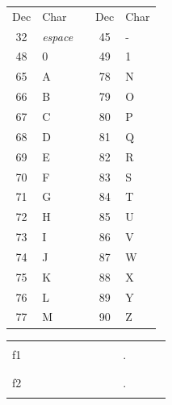 \documentclass[11pt,a4paper]{article}
\begin{document}
\begin{table}[ht!]
  \centering
  \begin{minipage}{0.3\textwidth}
    \centering

\begin{tabular}{ |c|C{0.9cm}| m{0.3cm} |c|C{0.9cm}| }
 
Dec & Char &   & Dec & Char \\
 
32 & { \scriptsize \textit{espace} }  &  & 45 & - \\
 
48 & 0 &  & 49 & 1 \\
 
65 & A &  & 78 & N \\
66 & B &  & 79 & O \\
67 & C &  & 80 & P \\
68 & D &  & 81 & Q \\
69 & E &  & 82 & R \\
70 & F &  & 83 & S \\
71 & G &  & 84 & T \\
72 & H &  & 85 & U \\
73 & I &  & 86 & V \\
74 & J &  & 87 & W \\
75 & K &  & 88 & X \\
76 & L &  & 89 & Y \\
77 & M &  & 90 & Z \\
 
\end{tabular}

  \end{minipage}
  \hfillx
  \begin{minipage}{0.65\textwidth}
    \centering

\begin{tabular}{ c   | m{0.45cm} | m{0.45cm} | m{0.45cm} | m{0.45cm} | m{0.45cm} | m{0.45cm} | m{0.45cm} | m{0.45cm} | c | m{0.45cm} | m{0.45cm} | m{0.45cm} | }
\cline{2-9} \cline{11-13}
 & & & & & & & & &   & & & \\
f1   & & & & & & & & &  .  & & & \\
 & & & & & & & & &   & & & \\
\cline{2-9} \cline{11-13}
 & & & & & & & & &   & & & \\
f2   & & & & & & & & &  .  & & & \\
 & & & & & & & & &   & & & \\
\cline{2-9} \cline{11-13}
\end{tabular}

  \end{minipage}
\end{table}
\end{document}
